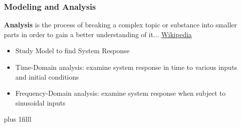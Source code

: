 \documentclass[fleqn]{beamer} %
\newcommand{\sectionIsubsectionIItitle}{Modeling and Analysis}
\newcommand{\btVFill}{\vskip0pt plus 1filll}
\begin{document}
			\begin{frame}
				\frametitle{\sectionIsubsectionIItitle}
				\bigskip

				{\bf Analysis} is the process of breaking a complex topic or substance into smaller parts in order to gain a better understanding of it... \href{https://en.wikipedia.org/wiki/Analysis}{\tiny Wikipedia}

				\begin{itemize}
					\item Study Model to find System Response
					\item Time-Domain analysis: examine system response in time to various inputs and initial conditions
					\item Frequency-Domain analysis: examine system response when subject to sinusoidal inputs
				\end{itemize}
		
				\btVFill
			\end{frame}
\end{document}
